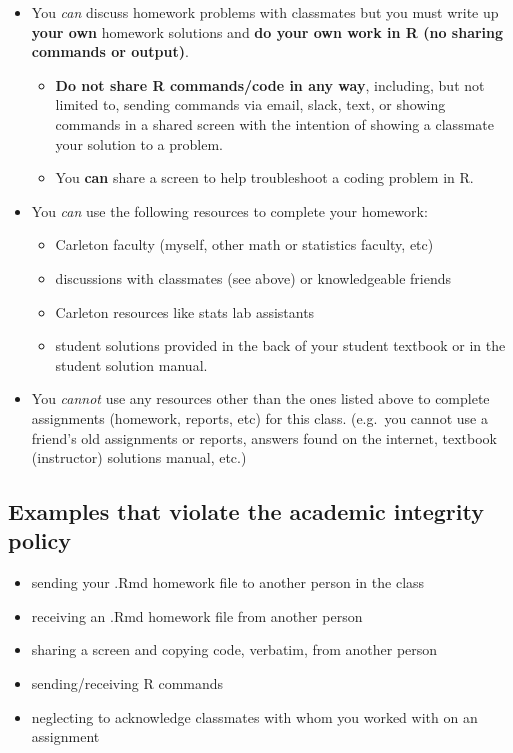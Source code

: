 \documentclass[
]{book}
\providecommand{\tightlist}{%
  \setlength{\itemsep}{0pt}\setlength{\parskip}{0pt}}
\begin{document}
\begin{itemize}
\tightlist
\item
  You \emph{can} discuss homework problems with classmates but you must
  write up \textbf{your own} homework solutions and \textbf{do your own work in R
  (no sharing commands or output)}.

  \begin{itemize}
  \tightlist
  \item
    \textbf{Do not share R commands/code in any way}, including, but not
    limited to, sending commands via email, slack, text, or showing
    commands in a shared screen with the intention of showing a
    classmate your solution to a problem.
  \item
    You \textbf{can} share a screen to help troubleshoot a coding problem
    in R.
  \end{itemize}
\item
  You \emph{can} use the following resources to complete your homework:

  \begin{itemize}
  \tightlist
  \item
    Carleton faculty (myself, other math or statistics faculty, etc)
  \item
    discussions with classmates (see above) or knowledgeable friends
  \item
    Carleton resources like stats lab assistants
  \item
    student solutions provided in the back of your student textbook
    or in the student solution manual.
  \end{itemize}
\item
  You \emph{cannot} use any resources other than the ones listed above to
  complete assignments (homework, reports, etc) for this class.
  (e.g.~you cannot use a friend's old assignments or reports, answers
  found on the internet, textbook (instructor) solutions manual, etc.)
\end{itemize}

\hypertarget{examples-that-violate-the-academic-integrity-policy}{%
\subsection{Examples that violate the academic integrity policy}\label{examples-that-violate-the-academic-integrity-policy}}

\begin{itemize}
\tightlist
\item
  sending your .Rmd homework file to another person in the class
\item
  receiving an .Rmd homework file from another person
\item
  sharing a screen and copying code, verbatim, from another person
\item
  sending/receiving R commands
\item
  neglecting to acknowledge classmates with whom you worked with on an
  assignment
\end{itemize}
\end{document}

